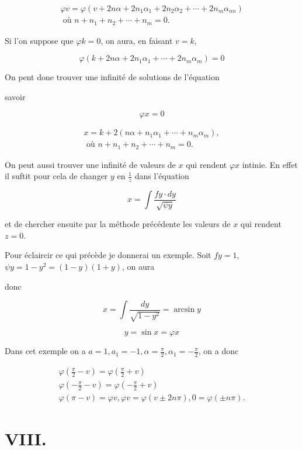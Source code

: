 \documentclass{article}
\begin{document}
\[
\begin{gathered}
\varphi v=\varphi\left(v+2 n \alpha+2 n_{1} \alpha_{1}+2 n_{2} \alpha_{2}+\cdots+2 n_{m} \alpha_{n n}\right) \\
\text { où } n+n_{1}+n_{2}+\cdots+n_{m}=0 .
\end{gathered}
\]

Si l'on suppose que \(\varphi k=0\), on aura, en faisant \(v=k\),

\[
\varphi\left(k+2 n \alpha+2 n_{1} \alpha_{1}+\cdots+2 n_{m} \alpha_{m}\right)=0
\]

On pent done trouver une infinité de solutions de l'équation

savoir

\[
\varphi x=0
\]

\[
\begin{gathered}
x=k+2\left(n \alpha+n_{1} \alpha_{1}+\cdots+n_{m} \alpha_{m}\right), \\
\text { où } n+n_{1}+n_{2}+\cdots+n_{m}=0 .
\end{gathered}
\]

On peut aussi trouver une infinité de valeurs de \(x\) qui rendent \(\varphi x\) intinie. En effet il suftit pour cela de changer \(y\) en \(\frac{1}{z}\) dans l'équation

\[
x=\int \frac{f y \cdot d y}{\sqrt{\psi y}}
\]

et de chercher ensuite par la méthode précédente les valeurs de \(x\) qui rendent \(z=0\).

Pour éclaircir ce qui précède je donnerai un exemple. Soit \(f y=1\), \(\psi y=1-y^{2}=(1-y)(1+y)\), on aura

donc

\[
x=\int \frac{d y}{\sqrt{1-y^{2}}}=\arcsin y
\]

\[
y=\sin x=\varphi x
\]

Dans cet exemple on a \(a=1, a_{1}=-1, \alpha=\frac{\pi}{2}, \alpha_{1}=-\frac{\pi}{2}\), on a donc

\[
\begin{gathered}
\varphi\left(\frac{\pi}{2}-v\right)=\varphi\left(\frac{\pi}{2}+v\right) \\
\varphi\left(-\frac{\pi}{2}-v\right)=\varphi\left(-\frac{\pi}{2}+v\right) \\
\varphi(\pi-v)=\varphi v, \varphi v=\varphi(v \pm 2 n \pi), 0=\varphi( \pm n \pi) .
\end{gathered}
\]

\section*{VIII.}
\end{document}
